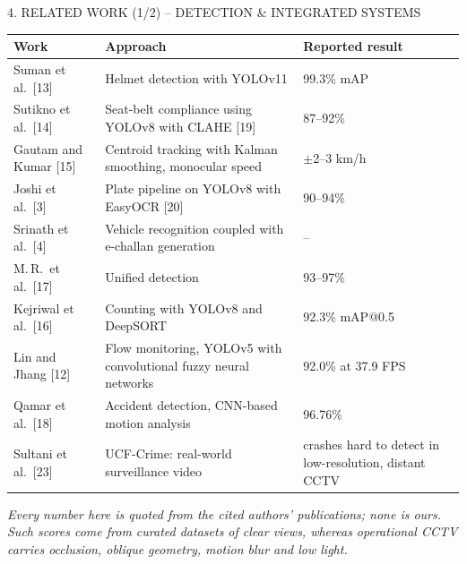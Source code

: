 \documentclass[aspectratio=169,10pt,t]{beamer}
\begin{document}
\begin{frame}{4. RELATED WORK (1/2) -- DETECTION \& INTEGRATED SYSTEMS}
\scriptsize
\centering
\begin{tabularx}{\textwidth}{@{}L{0.2\textwidth}L{0.45\textwidth}Y@{}}
\toprule
\textbf{Work} & \textbf{Approach} & \textbf{Reported result}\\
\midrule
Suman et al.\ [13]      & Helmet detection with YOLOv11 & 99.3\% mAP\\
Sutikno et al.\ [14]    & Seat-belt compliance using YOLOv8 with CLAHE [19] & 87--92\%\\
Gautam and Kumar [15]   & Centroid tracking with Kalman smoothing, monocular speed & $\pm$2--3 km/h\\
Joshi et al.\ [3]       & Plate pipeline on YOLOv8 with EasyOCR [20] & 90--94\%\\
Srinath et al.\ [4]     & Vehicle recognition coupled with e-challan generation & --\\
M.\,R.\ et al.\ [17]    & Unified detection & 93--97\%\\
Kejriwal et al.\ [16]   & Counting with YOLOv8 and DeepSORT & 92.3\% mAP@0.5\\
Lin and Jhang [12]      & Flow monitoring, YOLOv5 with convolutional fuzzy neural networks & 92.0\% at 37.9 FPS\\
Qamar et al.\ [18]      & Accident detection, CNN-based motion analysis & 96.76\%\\
Sultani et al.\ [23]    & UCF-Crime: real-world surveillance video & crashes hard to detect in low-resolution, distant CCTV\\
\bottomrule
\end{tabularx}
\vspace{0.5em}

{\tiny\itshape Every number here is quoted from the cited authors' publications; none is ours. Such scores come from
curated datasets of clear views, whereas operational CCTV carries occlusion, oblique geometry, motion blur and low light.\par}
\end{frame}
\end{document}
